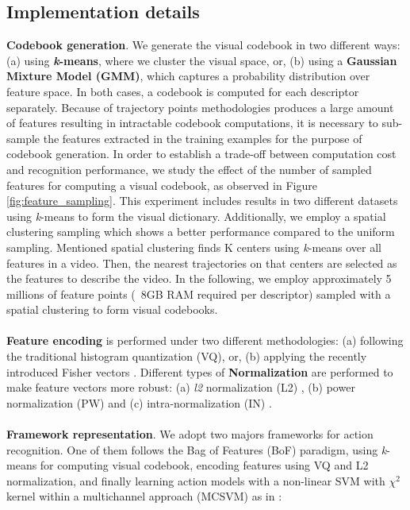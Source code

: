 \subsection{Implementation details}

\textbf{Codebook generation}. We generate the visual codebook in two different ways: (a) using \textbf{\textit{k}-means}, where we cluster the visual space, or, (b) using a \textbf{Gaussian Mixture Model (GMM)}, which captures a probability distribution over feature space. In both cases, a codebook is computed for each descriptor separately. Because of trajectory points methodologies produces a large amount of features resulting in intractable codebook computations, it is necessary to sub-sample the features extracted in the training examples for the purpose of codebook generation. In order to establish a trade-off between computation cost and recognition performance, we study the effect of the number of sampled features for computing a visual codebook, as observed in Figure \ref{fig:feature_sampling}. This experiment includes results in two different datasets using \textit{k}-means to form the visual dictionary. Additionally, we employ a spatial clustering sampling which shows a better performance compared to the uniform sampling. Mentioned spatial clustering finds K centers using \textit{k}-means over all features in a video. Then, the nearest trajectories on that centers are selected as the features to describe the video. In the following, we employ approximately 5 millions of feature points (~8GB RAM required per descriptor) sampled with a spatial clustering to form visual codebooks.\\\\
\textbf{Feature encoding} is performed under two different methodologies: (a) following the traditional histogram quantization (VQ), or, (b) applying the recently introduced Fisher vectors \cite{perronnin2010}. Different types of \textbf{Normalization} are performed to make feature vectors more robust: (a) \textit{l2} normalization (L2) \cite{perronnin2010}, (b) power normalization (PW) \cite{perronnin2010} and (c) intra-normalization (IN) \cite{xwang2013}. \\\\
\textbf{Framework representation}. We adopt two majors frameworks for action recognition. One of them follows the Bag of Features (BoF) paradigm, using \textit{k}-means for computing visual codebook, encoding features using VQ and L2 normalization, and finally learning action models with a non-linear SVM with $\chi^2$ kernel within a multichannel approach (MCSVM) as in \cite{zhang2007}:
